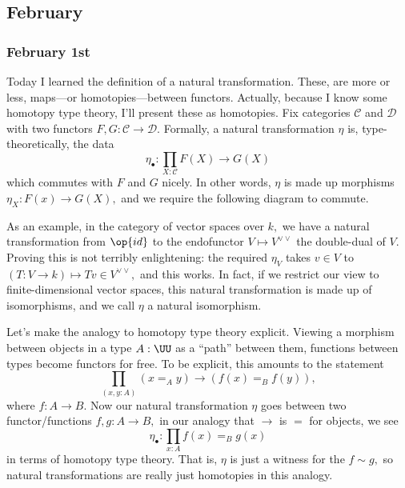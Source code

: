 \subsection{February}

\subsubsection{February 1st}
Today I learned the definition of a natural transformation. These, are more or less, maps---or homotopies---between functors. Actually, because I know some homotopy type theory, I'll present these as homotopies. Fix categories $\mathcal C$ and $\mathcal D$ with two functors $F,G:\mathcal C\to\mathcal D.$ Formally, a natural transformation $\eta$ is, type-theoretically, the data
\[\eta_\bullet:\prod_{X:\mathcal C}F(X)\to G(X)\]
which commutes with $F$ and $G$ nicely. In other words, $\eta$ is made up morphisms $\eta_X:F(x)\to G(X),$ and we require the following diagram to commute.
\begin{center}
\end{center}
As an example, in the category of vector spaces over $k,$ we have a natural transformation from $\op{id}$ to the endofunctor $V\mapsto V^{\vee\vee}$ the double-dual of $V.$ Proving this is not terribly enlightening: the required $\eta_V$ takes $v\in V$ to $(T:V\to k)\mapsto Tv\in V^{\vee\vee},$ and this works. In fact, if we restrict our view to finite-dimensional vector spaces, this natural transformation is made up of isomorphisms, and we call $\eta$ a natural isomorphism.

Let's make the analogy to homotopy type theory explicit. Viewing a morphism between objects in a type $A:\UU$ as a ``path'' between them, functions between types become functors for free. To be explicit, this amounts to the statement
\[\prod_{(x,y:A)}(x=_Ay)\to(f(x)=_Bf(y)),\]
where $f:A\to B.$ Now our natural transformation $\eta$ goes between two functor/functions $f,g:A\to B,$ in our analogy that $\to$ is $=$ for objects, we see
\[\eta_\bullet:\prod_{x:A}f(x)=_Bg(x)\]
in terms of homotopy type theory. That is, $\eta$ is just a witness for the $f\sim g,$ so natural transformations are really just homotopies in this analogy.

